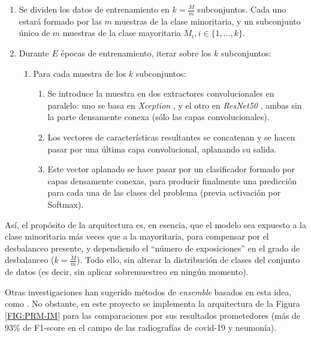 \begin{enumerate}
    \fontsize{11pt}{12pt}\selectfont
    \item Se dividen los datos de entrenamiento en $k = \frac{M}{m}$ subconjuntos. Cada uno estará formado por las $m$ muestras de la clase minoritaria, y un subconjunto único de $m$ muestras de la clase mayoritaria $M_i, i \in \{1, ..., k\}$.
    \item Durante $E$ épocas de entrenamiento, iterar sobre los $k$ subconjuntos:
    \begin{enumerate}
        \fontsize{11pt}{12pt}\selectfont
        \item Para cada muestra de los $k$ subconjuntos:
        \begin{enumerate}
            \fontsize{11pt}{12pt}\selectfont
            \item Se introduce la muestra en dos extractores convolucionales en paralelo: uno se basa en \textit{Xception} \cite{chollet2017xception}, y el otro en \textit{ResNet50} \cite{he2016deep}, ambas sin la parte densamente conexa (sólo las capas convolucionales).
            \item Los vectores de características resultantes se concatenan y se hacen pasar por una última capa convolucional, aplanando su salida.
            \item Este vector aplanado se hace pasar por un clasificador formado por capas densamente conexas, para producir finalmente una predicción para cada una de las clases del problema (previa activación por Softmax).
        \end{enumerate}
    \end{enumerate}
\end{enumerate}

Así, el propósito de la arquitectura es, en esencia, que el modelo sea expuesto a la clase minoritaria más veces que a la mayoritaria, para compensar por el desbalanceo presente, y dependiendo el ``número de exposiciones'' en el grado de desbalanceo ($k = \frac{M}{m}$). Todo ello, sin alterar la distribución de clases del conjunto de datos (es decir, sin aplicar sobremuestreo en ningún momento).

Otras investigaciones han sugerido métodos de \textit{ensemble} basados en esta idea, como \citet{guo2004learning}. No obstante, en este proyecto se implementa la arquitectura de la Figura \ref{FIG:PRM-IM} para las comparaciones por sus resultados prometedores (más de 93\% de F1-score en el campo de las radiografías de covid-19 y neumonía).

